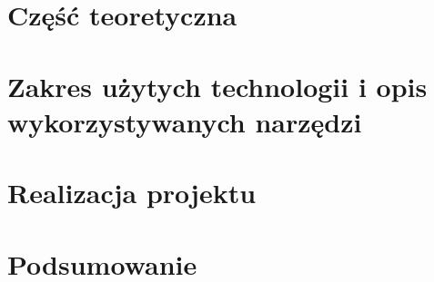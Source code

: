 \section{Część teoretyczna}

\newpage

\section{Zakres użytych technologii i opis wykorzystywanych narzędzi}

\newpage

\section{Realizacja projektu}

\newpage

\section{Podsumowanie}

\newpage